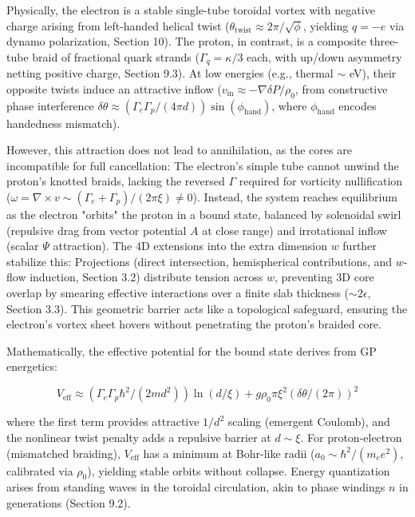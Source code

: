 \documentclass{article}
\begin{document}
Physically, the electron is a stable single-tube toroidal vortex with negative charge arising from left-handed helical twist ($\theta_{\text{twist}} \approx 2\pi / \sqrt{\phi}$, yielding $q = -e$ via dynamo polarization, Section 10). The proton, in contrast, is a composite three-tube braid of fractional quark strands ($\Gamma_q = \kappa / 3$ each, with up/down asymmetry netting positive charge, Section 9.3). At low energies (e.g., thermal $\sim$ eV), their opposite twists induce an attractive inflow ($v_{\text{in}} \approx - \nabla \delta P / \rho_0$, from constructive phase interference $\delta \theta \approx (\Gamma_e \Gamma_p / (4\pi d)) \sin(\phi_{\text{hand}})$, where $\phi_{\text{hand}}$ encodes handedness mismatch).

However, this attraction does not lead to annihilation, as the cores are incompatible for full cancellation: The electron's simple tube cannot unwind the proton's knotted braids, lacking the reversed $\Gamma$ required for vorticity nullification ($\omega = \nabla \times v \sim (\Gamma_e + \Gamma_p) / (2\pi \xi) \neq 0$). Instead, the system reaches equilibrium as the electron "orbits" the proton in a bound state, balanced by solenoidal swirl (repulsive drag from vector potential $A$ at close range) and irrotational inflow (scalar $\Psi$ attraction). The 4D extensions into the extra dimension $w$ further stabilize this: Projections (direct intersection, hemispherical contributions, and $w$-flow induction, Section 3.2) distribute tension across $w$, preventing 3D core overlap by smearing effective interactions over a finite slab thickness ($\sim 2\epsilon$, Section 3.3). This geometric barrier acts like a topological safeguard, ensuring the electron's vortex sheet hovers without penetrating the proton's braided core.

Mathematically, the effective potential for the bound state derives from GP energetics:

\[
V_{\text{eff}} \approx (\Gamma_e \Gamma_p \hbar^2 / (2 m d^2)) \ln(d / \xi) + g \rho_0 \pi \xi^2 (\delta \theta / (2\pi))^2
\]

where the first term provides attractive $1/d^2$ scaling (emergent Coulomb), and the nonlinear twist penalty adds a repulsive barrier at $d \sim \xi$. For proton-electron (mismatched braiding), $V_{\text{eff}}$ has a minimum at Bohr-like radii ($a_0 \sim \hbar^2 / (m_e e^2)$, calibrated via $\rho_0$), yielding stable orbits without collapse. Energy quantization arises from standing waves in the toroidal circulation, akin to phase windings $n$ in generations (Section 9.2).
\end{document}

